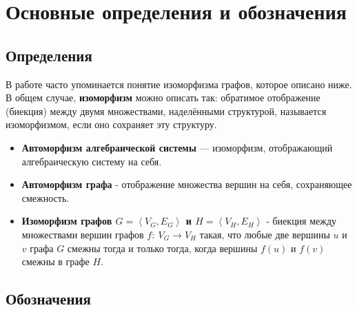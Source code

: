 \section{Основные определения и обозначения}
\label{sec:Definition_2} 
\large

\subsection{Определения}

В работе часто упоминается понятие изоморфизма графов, которое описано ниже. В общем случае, \textbf{изоморфизм} можно описать так: обратимое отображение (биекция) между двумя множествами, наделёнными структурой, называется изоморфизмом, если оно сохраняет эту структуру.

\begin{itemize}
\item \textbf{Автоморфизм алгебраической системы} — изоморфизм, отображающий алгебраическую систему на себя.
\item \textbf{Автоморфизм графа} - отображение множества вершин на себя, сохраняющее смежность.
\item \textbf{Изоморфизм графов $G=\left\langle V_{G},E_{G}\right\rangle$ и $H=\left\langle V_{H},E_{H}\right\rangle$} - биекция между множествами вершин графов $f\colon \ V_{G}\rightarrow V_{H}$ такая, что любые две вершины $u$ и $v$ графа $G$ смежны тогда и только тогда, когда вершины $f(u)$ и $f(v)$ смежны в графе $H$.
\end{itemize}




\subsection{Обозначения}


